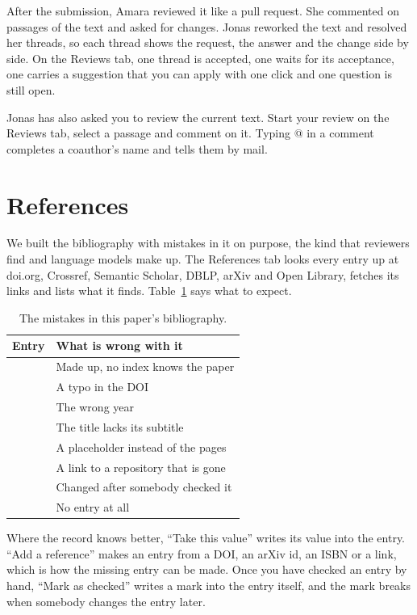 \documentclass[11pt]{article}
\begin{document}
After the submission, Amara reviewed it like a pull request. She commented on
passages of the text and asked for changes. Jonas reworked the text and
resolved her threads, so each thread shows the request, the answer and the
change side by side. On the Reviews tab, one thread is accepted, one waits for
its acceptance, one carries a suggestion that you can apply with one click and
one question is still open.

Jonas has also asked you to review the current text. Start your review on the
Reviews tab, select a passage and comment on it. Typing @ in a comment
completes a coauthor's name and tells them by mail.

\section{References}\label{sec:references}

We built the bibliography with mistakes in it on purpose, the kind that
reviewers find and language models make up. The References tab looks every
entry up at doi.org, Crossref, Semantic Scholar, DBLP, arXiv and Open Library,
fetches its links and lists what it finds. Table~\ref{tab:refs} says what to
expect.

\begin{table}[ht]
  \centering
  \begin{tabular}{@{}ll@{}}
    \toprule
    Entry & What is wrong with it \\
    \midrule
    \cite{hartmann2023deadline} & Made up, no index knows the paper \\
    \cite{dourish1992awareness} & A typo in the DOI \\
    \cite{nicolaescu2016yjs} & The wrong year \\
    \cite{kleppmann2019local} & The title lacks its subtitle \\
    \cite{ellis1989concurrency} & A placeholder instead of the pages \\
    \cite{collabtex} & A link to a repository that is gone \\
    \cite{wilson2014best} & Changed after somebody checked it \\
    \cite{mittelbach2004companion} & No entry at all \\
    \bottomrule
  \end{tabular}
  \caption{The mistakes in this paper's bibliography.}\label{tab:refs}
\end{table}

Where the record knows better, ``Take this value'' writes its value into the
entry. ``Add a reference'' makes an entry from a DOI, an arXiv id, an ISBN or a
link, which is how the missing entry can be made. Once you have checked an
entry by hand, ``Mark as checked'' writes a mark into the entry itself, and the
mark breaks when somebody changes the entry later.
\end{document}
